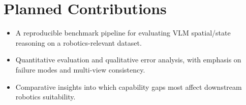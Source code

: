 \documentclass[10pt,twocolumn,letterpaper]{article}
\begin{document}
\section{Planned Contributions}
\begin{itemize}
  \item A reproducible benchmark pipeline for evaluating VLM spatial/state reasoning on a robotics-relevant dataset.
  \item Quantitative evaluation and qualitative error analysis, with emphasis on failure modes and multi-view consistency.
  \item Comparative insights into which capability gaps most affect downstream robotics suitability.
\end{itemize}
{\small


}




%
%
%    
%    
%
\end{document}
